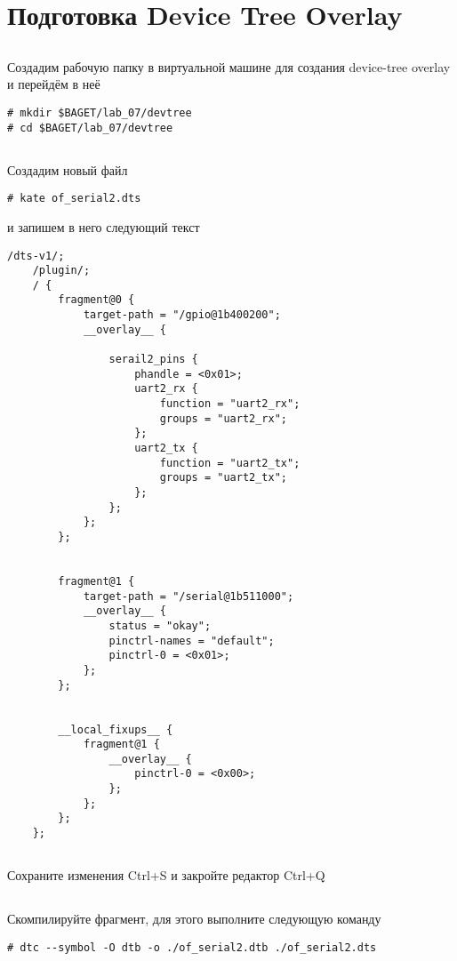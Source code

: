 \section{Подготовка Device Tree Overlay}

\subsection{} Создадим рабочую папку в виртуальной машине для создания device-tree overlay и перейдём в неё 
\begin{lstlisting}[style=bash]
# mkdir $BAGET/lab_07/devtree
# cd $BAGET/lab_07/devtree 
\end{lstlisting}

\subsection{}Создадим новый файл
\begin{lstlisting}[style=bash]
# kate of_serial2.dts
\end{lstlisting}
и запишем в него следующий текст
\begin{lstlisting}[style=stdout]
	/dts-v1/;
	/plugin/;
	/ {
		fragment@0 {
			target-path = "/gpio@1b400200";
			__overlay__ {
				
				serail2_pins {
					phandle = <0x01>;
					uart2_rx {
						function = "uart2_rx";
						groups = "uart2_rx";
					};
					uart2_tx {
						function = "uart2_tx";
						groups = "uart2_tx";
					};
				};
			};
		};
		
		
		fragment@1 { 
			target-path = "/serial@1b511000"; 
			__overlay__ { 
				status = "okay"; 
				pinctrl-names = "default"; 
				pinctrl-0 = <0x01>; 
			}; 
		}; 
		
		
		__local_fixups__ {
			fragment@1 {
				__overlay__ {
					pinctrl-0 = <0x00>;
				};
			};	
		};
	};
\end{lstlisting}

\subsection{}Сохраните изменения Ctrl+S и закройте редактор Ctrl+Q 

\subsection{}Скомпилируйте фрагмент, для этого выполните следующую команду
\begin{lstlisting}[style=bash]
# dtc --symbol -O dtb -o ./of_serial2.dtb ./of_serial2.dts
\end{lstlisting}

